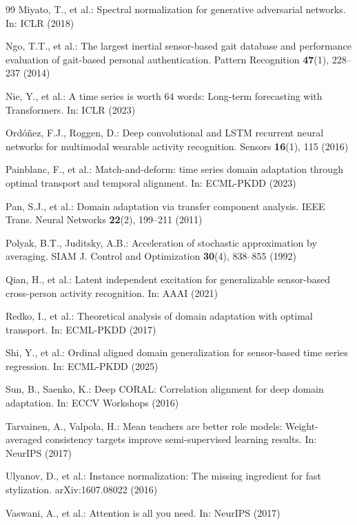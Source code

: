 \documentclass[conference]{IEEEtran}
\begin{document}
\begin{thebibliography}{99}
Miyato, T., et al.: Spectral normalization for generative adversarial networks. In: ICLR (2018)

Ngo, T.T., et al.: The largest inertial sensor-based gait database and performance evaluation of gait-based personal authentication. Pattern Recognition \textbf{47}(1), 228--237 (2014)

Nie, Y., et al.: A time series is worth 64 words: Long-term forecasting with Transformers. In: ICLR (2023)

Ordóñez, F.J., Roggen, D.: Deep convolutional and LSTM recurrent neural networks for multimodal wearable activity recognition. Sensors \textbf{16}(1), 115 (2016)

Painblanc, F., et al.: Match-and-deform: time series domain adaptation through optimal transport and temporal alignment. In: ECML-PKDD (2023)

Pan, S.J., et al.: Domain adaptation via transfer component analysis. IEEE Trans. Neural Networks \textbf{22}(2), 199--211 (2011)

Polyak, B.T., Juditsky, A.B.: Acceleration of stochastic approximation by averaging. SIAM J. Control and Optimization \textbf{30}(4), 838--855 (1992)

Qian, H., et al.: Latent independent excitation for generalizable sensor-based cross-person activity recognition. In: AAAI (2021)

Redko, I., et al.: Theoretical analysis of domain adaptation with optimal transport. In: ECML-PKDD (2017)

Shi, Y., et al.: Ordinal aligned domain generalization for sensor-based time series regression. In: ECML-PKDD (2025)

Sun, B., Saenko, K.: Deep CORAL: Correlation alignment for deep domain adaptation. In: ECCV Workshops (2016)

Tarvainen, A., Valpola, H.: Mean teachers are better role models: Weight-averaged consistency targets improve semi-supervised learning results. In: NeurIPS (2017)

Ulyanov, D., et al.: Instance normalization: The missing ingredient for fast stylization. arXiv:1607.08022 (2016)

Vaswani, A., et al.: Attention is all you need. In: NeurIPS (2017)


\end{thebibliography}
\end{document}
